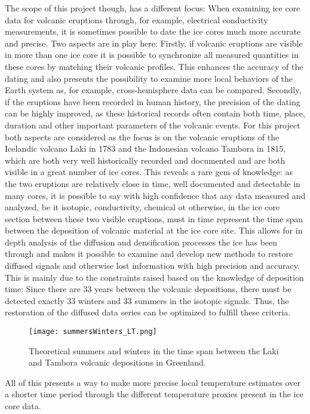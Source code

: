 \documentclass[../../CompleteThesis2/Complete_2ndDraft]{subfiles}
\begin{document}
	The scope of this project though, has a different focus: When examining ice core data for volcanic eruptions through, for example, electrical conductivity measurements, it is sometimes possible to date the ice cores much more accurate and precise. Two aspects are in play here: Firstly, if volcanic eruptions are visible in more than one ice core it is possible to synchronize all measured quantities in these cores by matching their volcanic profiles. This enhances the accuracy of the dating and also presents the possibility to examine more local behaviors of the Earth system as, for example, cross-hemisphere data can be compared. Secondly, if the eruptions have been recorded in human history, the precision of the dating can be highly improved, as these historical records often contain both time, place, duration and other important parameters of the volcanic events. For this project both aspects are considered as the focus is on the volcanic eruptions of the Icelandic volcano Laki in 1783 and the Indonesian volcano Tambora in 1815, which are both very well historically recorded and documented and are both visible in a great number of ice cores. This reveals a rare gem of knowledge: as the two eruptions are relatively close in time, well documented and detectable in many cores, it is possible to say with high confidence that any data measured and analyzed, be it isotopic, conductivity, chemical ot otherwise, in the ice core section between these two visible eruptions, must in time represent the time span between the deposition of volcanic material at the ice core site. This allows for in depth analysis of the diffusion and densification processes the ice has been through and makes it possible to examine and develop new methods to restore diffused signals and otherwise lost information with high precision and accuracy. This is mainly due to the constraints raised based on the knowledge of deposition time: Since there are 33 years between the volcanic depositions, there must be detected exactly 33 winters and 33 summers in the isotopic signals. Thus, the restoration of the diffused data series can be optimized to fulfill these criteria.
	\begin{figure}
		\centering
		\texttt{[image: summersWinters\_LT.png]}
		\caption[Summers and Winters between Laki and Tambora]{Theoretical summers and winters in the time span between the Laki and Tambora volcanic depositions in Greenland.}
	\end{figure}
	All of this presents a way to make more precise local temperature estimates over a shorter time period through the different temperature proxies present in the ice core data.
	
\end{document}
